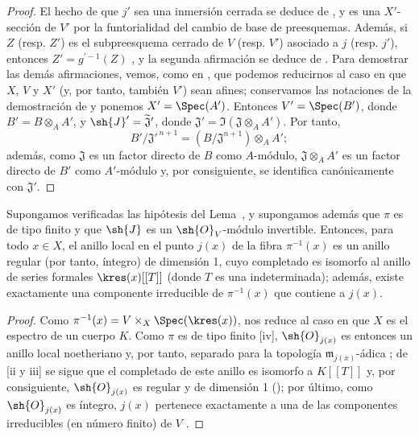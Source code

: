 \documentclass[oneside,10pt]{amsart}
\let\EGAOriginalLabel\label
\renewcommand{\label}[1]{\phantomsection\EGAOriginalLabel{#1}}
\begin{document}
\begin{proof}
El hecho de que $j'$ sea una inmersión cerrada se deduce de , y es una $X'$-sección de $V'$ por la funtorialidad del cambio de base de preesquemas.
Además, si $Z$ (resp. $Z'$) es el subpreesquema cerrado de $V$ (resp. $V'$) asociado a $j$ (resp. $j'$), entonces $Z'=g^{'-1}(Z)$ , y la segunda afirmación se deduce de .
Para demostrar las demás afirmaciones, vemos, como en , que podemos reducirnos al caso en que $X$, $V$ y $X'$ (y, por tanto, también $V'$) sean afines;
conservamos las notaciones de la demostración de  y ponemos $X'=\Spec(A')$.
Entonces $V'=\Spec(B')$, donde $B'=B\otimes_A A'$, y $\sh{J}'=\widetilde{\mathfrak J}'$, donde $\mathfrak{J}'=\Im(\mathfrak{J}\otimes_A A')$.
Por tanto,
\[
  B'/\mathfrak{J}'^{\,n+1}
  =(B/\mathfrak{J}^{n+1})\otimes_A A';
\]
además, como $\mathfrak{J}$ es un factor directo de $B$ como $A$-módulo, $\mathfrak{J}\otimes_A A'$ es un factor directo de $B'$ como $A'$-módulo y, por consiguiente, se identifica canónicamente con $\mathfrak{J}'$.
\end{proof}

\begin{corollary}[8.10.3]
\label{II.8.10.3}
Supongamos verificadas las hipótesis del Lema~, y supongamos además que $\pi$ es de tipo finito y que $\sh{J}$ es un $\sh{O}_V$-módulo invertible.
Entonces, para todo $x\in X$, el anillo local en el punto $j(x)$ de la fibra $\pi^{-1}(x)$ es un anillo regular (por tanto, íntegro) de dimensión 1, cuyo completado es isomorfo al anillo de series formales $\kres(x)[[T]]$ (donde $T$ es una indeterminada);
además, existe exactamente una componente irreducible de $\pi^{-1}(x)$ que contiene a $j(x)$.
\end{corollary}

\begin{proof}
Como $\pi^{-1}(x)=V\times_X\Spec(\kres(x))$,  nos reduce al caso en que $X$ es el espectro de un cuerpo $K$.
Como $\pi$ es de tipo finito [iv], $\sh{O}_{j(x)}$ es entonces un anillo local noetheriano y, por tanto, separado para la topología $\mathfrak{m}_{j(x)}$-ádica ;
de [ii y iii] se sigue que el completado de este anillo es isomorfo a $K[[T]]$ y, por consiguiente, $\sh{O}_{j(x)}$ es regular y de dimensión 1 (\cite[p.~17-01, th.~1]{I-1});
por último, como $\sh{O}_{j(x)}$ es íntegro, $j(x)$ pertenece exactamente a una de las componentes irreducibles (en número finito) de $V$ .
\end{proof}
\end{document}
